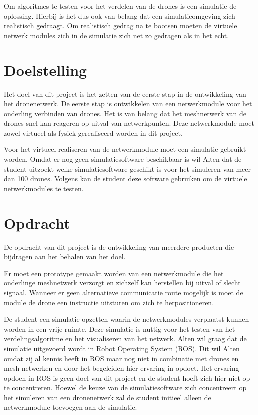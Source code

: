 \documentclass[a4paper, 11pt, oneside]{report}
\begin{document}
Om algoritmes te testen voor het verdelen van de drones is een simulatie de oplossing.
Hierbij is het dus ook van belang dat een simulatieomgeving zich realistisch gedraagt. 
Om realistisch gedrag na te bootsen moeten de virtuele netwerk modules zich in de simulatie zich net zo gedragen als in het echt.

\section{Doelstelling}
Het doel van dit project is het zetten van de eerste stap in de ontwikkeling van het dronenetwerk.
De eerste stap is ontwikkelen van een netwerkmodule voor het onderling verbinden van drones.
Het is van belang dat het meshnetwerk van de drones snel kan reageren op uitval van netwerkpunten.
Deze netwerkmodule moet zowel virtueel als fysiek gerealiseerd worden in dit project.

Voor het virtueel realiseren van de netwerkmodule moet een simulatie gebruikt worden. 
Omdat er nog geen simulatiesoftware beschikbaar is wil Alten dat de student uitzoekt welke simulatiesoftware geschikt is voor het simuleren van meer dan 100 drones.
Volgens kan de student deze software gebruiken om de virtuele netwerkmodules te testen.

\section{Opdracht}
De opdracht van dit project is de ontwikkeling van meerdere producten die bijdragen aan het behalen van het doel. 

Er moet een prototype gemaakt worden van een netwerkmodule die het onderlinge meshnetwerk verzorgt en zichzelf kan herstellen bij uitval of slecht signaal.
Wanneer er geen alternatieve communicatie route mogelijk is moet de module de drone een instructie uitsturen om zich te herpositioneren.

De student een simulatie opzetten waarin de netwerkmodules verplaatst kunnen worden in een vrije ruimte. 
Deze simulatie is nuttig voor het testen van het verdelingsalgoritme en het visualiseren van het netwerk.
Alten wil graag dat de simulatie uitgevoerd wordt in Robot Operating System (ROS). 
Dit wil Alten omdat zij al kennis heeft in ROS maar nog niet in combinatie met drones en mesh netwerken en door het begeleiden hier ervaring in opdoet.
Het ervaring opdoen in ROS is geen doel van dit project en de student hoeft zich hier niet op te concentreren.
Hoewel de keuze van de simulatiesoftware zich concentreert op het simuleren van een dronenetwerk zal de student initieel alleen de netwerkmodule toevoegen aan de simulatie. 
\end{document}
